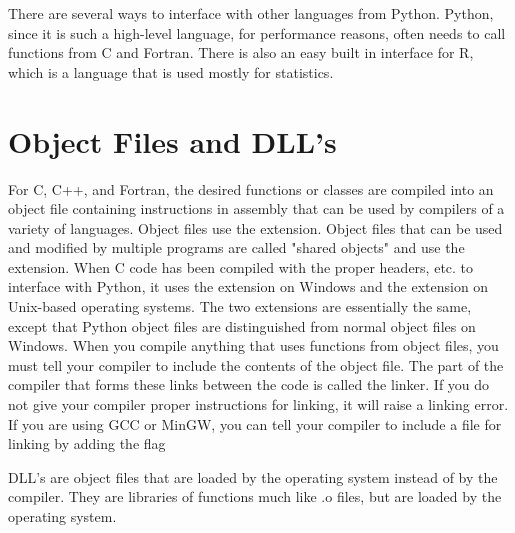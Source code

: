\label{lab:cwrap}


There are several ways to interface with other languages from Python.
Python, since it is such a high-level language, for performance reasons, often needs to call functions from C and Fortran.
There is also an easy built in interface for R, which is a language that is used mostly for statistics.

\section*{Object Files and DLL's}

For C, C++, and Fortran, the desired functions or classes are compiled into an object file containing instructions in assembly that can be used by compilers of a variety of languages.
Object files use the  extension.
Object files that can be used and modified by multiple programs are called "shared objects" and use the  extension.
When C code has been compiled with the proper headers, etc. to interface with Python, it uses the  extension on Windows and the  extension on Unix-based operating systems.
The two extensions are essentially the same, except that Python object files are distinguished from normal object files on Windows.
When you compile anything that uses functions from object files, you must tell your compiler to include the contents of the object file.
The part of the compiler that forms these links between the code is called the linker.
If you do not give your compiler proper instructions for linking, it will raise a linking error.
If you are using GCC or MinGW, you can tell your compiler to include a file for linking by adding the flag 

DLL's are object files that are loaded by the operating system instead of by the compiler.
They are libraries of functions much like .o files, but are loaded by the operating system.






